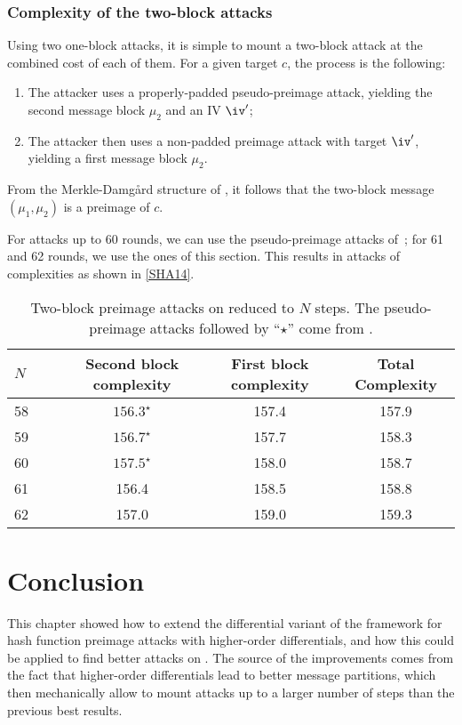   \subsubsection{Complexity of the two-block attacks}
  Using two one-block attacks, it is simple to mount a two-block attack at the combined cost of each of them.
  For a given target $c$, the process is the following:
    \begin{enumerate}
      \item The attacker uses a properly-padded pseudo-preimage attack, yielding the second message block $\mu_2$ and an IV $\iv'$;
      \item The attacker then uses a non-padded preimage attack with target $\iv'$, yielding a first message block $\mu_2$.
    \end{enumerate}
From the Merkle-Damg\aa rd structure of \shaone, it follows that the two-block message $(\mu_1, \mu_2)$ 
    is a preimage of $c$.

    For attacks up to 60 rounds, we can use the pseudo-preimage attacks of~\cite{DBLP:conf/crypto/KnellwolfK12}; for 61 and 62 rounds,
    we use the ones of this section. This results in attacks of complexities as shown in \autoref{SHA14}.

  \begin{table}[htb]
    \caption[Two-block preimage.]{Two-block preimage attacks on \shaone reduced to $N$ steps. The pseudo-preimage attacks followed by
    ``$\star$'' come from \cite{DBLP:conf/crypto/KnellwolfK12}.\label{SHA14}}
    \begin{center}
      \begin{tabular}{l c c c } \toprule
        $N\qquad$ & Second block complexity\phantom{bla} & First block complexity\phantom{bla}  & Total Complexity \\\midrule
        58    & $156.3^\star$ & 157.4& 157.9\\ 
        59    & $156.7^\star$ & 157.7& 158.3\\ 
        60    & $157.5^\star$ & 158.0& 158.7\\ 
        61    & 156.4    & 158.5& 158.8\\ 
        62    & 157.0    & 159.0& 159.3\\ 
        \bottomrule
        \hline
      \end{tabular}
    \end{center}
  \end{table}

\section{Conclusion}
This chapter showed how to extend the differential variant of the \mitm framework for hash function preimage attacks with higher-order differentials,
and how this could be applied to find better attacks on \shaone.
The source of the improvements comes from the fact that higher-order differentials lead to better message partitions, which
then mechanically allow to mount attacks up to a larger number of steps than the previous best
results.

